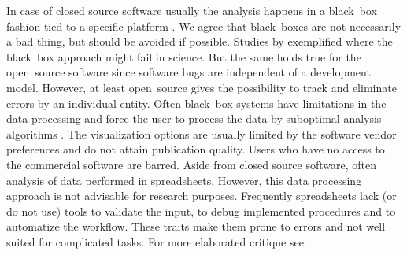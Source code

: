 In case of closed source software usually the analysis happens in a 
black~box fashion tied to a specific platform \citep{roediger_RJ_2013, 
Spiess_2014}. We agree that black~boxes are not necessarily a bad thing, but 
should be avoided if possible. Studies by \citet{mccullough_2008, Almiron_2010, 
Duran_2014} exemplified where the black~box approach might fail in science. But 
the same holds true for the open~source software since software bugs are 
independent of a development model. However, at least open~source gives the 
possibility to track and eliminate  errors by an individual entity. Often 
black~box systems have limitations in the data processing and force the user to 
process the data by suboptimal analysis algorithms \citep{ruijter_2013}. The 
visualization options are usually limited by the software vendor preferences and 
do not attain publication quality. Users who have no access to the commercial 
software are barred. Aside from closed source software, often analysis of data 
performed in spreadsheets. However, this data processing approach is not 
advisable for research purposes. Frequently spreadsheets  lack (or do not use) 
tools to validate the input, to debug implemented procedures and to automatize 
the workflow. These traits make them prone to errors and not well suited for 
complicated tasks. For more elaborated critique see \citet{mccullough_2008, 
burns_2014}.

